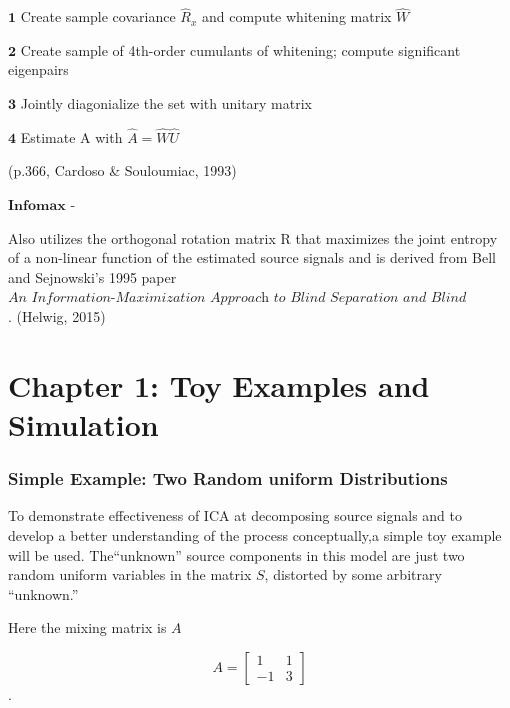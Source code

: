 \documentclass[12pt,twoside]{amherstthesis}
\begin{document}
  \(\textbf{1}\) Create sample covariance \(\hat{R}_x\) and compute
  whitening matrix \(\hat{W}\) \newline
  
  \(\textbf{2}\) Create sample of 4th-order cumulants of whitening;
  compute significant eigenpairs \newline
  
  \(\textbf{3}\) Jointly diagonialize the set with unitary matrix \newline
  
  \(\textbf{4}\) Estimate A with \(\hat{A} =\hat{W}\hat{U}\) \newline
  
  (p.366, Cardoso \& Souloumiac, 1993) \newline
  
  \(\textbf{Infomax}\) - \newline
  
  Also utilizes the orthogonal rotation matrix R that maximizes the joint
  entropy of a non-linear function of the estimated source signals and is
  derived from Bell and Sejnowski's 1995 paper
  \(\textit{An Information-Maximization Approach to Blind Separation and Blind Deconvolution}\).
  (Helwig, 2015)
  
  \chapter{Chapter 1: Toy Examples and
  Simulation}\label{chapter-1-toy-examples-and-simulation}
  
  \subsection{Simple Example: Two Random uniform
  Distributions}\label{simple-example-two-random-uniform-distributions}
  
  To demonstrate effectiveness of ICA at decomposing source signals and to
  develop a better understanding of the process conceptually,a simple toy
  example will be used. The``unknown'' source components in this model are
  just two random uniform variables in the matrix \(S\), distorted by some
  arbitrary ``unknown.'' \newline
  
  Here the mixing matrix is \(A\)
  
  \[A = \begin{bmatrix} 1 & 1 \\ -1 & 3  \end{bmatrix}\] .
  
\end{document}

